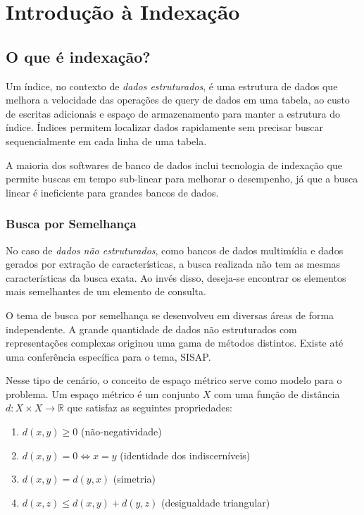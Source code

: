 \chapter{Introdução à Indexação}

\section{O que é indexação?}

Um índice, no contexto de \textit{dados estruturados}, é uma estrutura de dados que melhora a velocidade das operações de query de dados em uma tabela, ao custo de escritas adicionais e espaço de armazenamento para manter a estrutura do índice. Índices permitem localizar dados rapidamente sem precisar buscar sequencialmente em cada linha de uma tabela.

A maioria dos softwares de banco de dados inclui tecnologia de indexação que permite buscas em tempo sub-linear para melhorar o desempenho, já que a busca linear é ineficiente para grandes bancos de dados.\cite{databaseindex:wiki}

\subsection{Busca por Semelhança}

No caso de \textit{dados não estruturados}, como bancos de dados multimídia e dados gerados por extração de características, a busca realizada não tem as mesmas características da busca exata. Ao invés disso, deseja-se encontrar os elementos mais semelhantes de um elemento de consulta.

O tema de busca por semelhança\cite{simsearch:wiki} se desenvolveu em diversas áreas de forma independente. A grande quantidade de dados não estruturados com representações complexas originou uma gama de métodos distintos. Existe até uma conferência específica para o tema, SISAP.

Nesse tipo de cenário, o conceito de espaço métrico serve como modelo para o problema. Um espaço métrico é um conjunto $X$ com uma função de distância $d: X \times X \to \mathbb{R}$ que satisfaz as seguintes propriedades:

\begin{enumerate}
    \item $d(x, y) \geq 0$ (não-negatividade)
    \item $d(x, y) = 0 \iff x = y$ (identidade dos indiscerníveis)
    \item $d(x, y) = d(y, x)$ (simetria)
    \item $d(x, z) \leq d(x, y) + d(y, z)$ (desigualdade triangular)
\end{enumerate}

